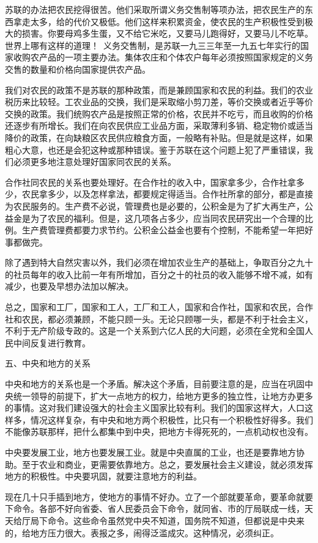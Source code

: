 \documentclass[UTF8, 12pt, a4paper]{ctexrep}
\begin{document}
苏联的办法把农民挖得很苦。他们采取所谓义务交售制等项办法，把农民生产的东西拿走太多，给的代价又极低。他们这样来积累资金，使农民的生产积极性受到极大的损害。你要母鸡多生蛋，又不给它米吃，又要马儿跑得好，又要马儿不吃草。世界上哪有这样的道理！~义务交售制，是苏联一九三三年至一九五七年实行的国家收购农产品的一项主要办法。集体农庄和个体农户每年必须按照国家规定的义务交售的数量和价格向国家提供农产品。~

我们对农民的政策不是苏联的那种政策，而是兼顾国家和农民的利益。我们的农业税历来比较轻。工农业品的交换，我们是采取缩小剪刀差，等价交换或者近乎等价交换的政策。我们统购农产品是按照正常的价格，农民并不吃亏，而且收购的价格还逐步有所增长。我们在向农民供应工业品方面，采取薄利多销、稳定物价或适当降价的政策，在向缺粮区农民供应粮食方面，一般略有补贴。但是就是这样，如果粗心大意，也还是会犯这种或那种错误。鉴于苏联在这个问题上犯了严重错误，我们必须更多地注意处理好国家同农民的关系。

合作社同农民的关系也要处理好。在合作社的收入中，国家拿多少，合作社拿多少，农民拿多少，以及怎样拿法，都要规定得适当。合作社所拿的部分，都是直接为农民服务的。生产费不必说，管理费也是必要的，公积金是为了扩大再生产，公益金是为了农民的福利。但是，这几项各占多少，应当同农民研究出一个合理的比例。生产费管理费都要力求节约。公积金公益金也要有个控制，不能希望一年把好事都做完。

除了遇到特大自然灾害以外，我们必须在增加农业生产的基础上，争取百分之九十的社员每年的收入比前一年有所增加，百分之十的社员的收入能够不增不减，如有减少，也要及早想办法加以解决。

总之，国家和工厂，国家和工人，工厂和工人，国家和合作社，国家和农民，合作社和农民，都必须兼顾，不能只顾一头。无论只顾哪一头，都是不利于社会主义，不利于无产阶级专政的。这是一个关系到六亿人民的大问题，必须在全党和全国人民中间反复进行教育。

五、中央和地方的关系

中央和地方的关系也是一个矛盾。解决这个矛盾，目前要注意的是，应当在巩固中央统一领导的前提下，扩大一点地方的权力，给地方更多的独立性，让地方办更多的事情。这对我们建设强大的社会主义国家比较有利。我们的国家这样大，人口这样多，情况这样复杂，有中央和地方两个积极性，比只有一个积极性好得多。我们不能像苏联那样，把什么都集中到中央，把地方卡得死死的，一点机动权也没有。

中央要发展工业，地方也要发展工业。就是中央直属的工业，也还是要靠地方协助。至于农业和商业，更需要依靠地方。总之，要发展社会主义建设，就必须发挥地方的积极性。中央要巩固，就要注意地方的利益。

现在几十只手插到地方，使地方的事情不好办。立了一个部就要革命，要革命就要下命令。各部不好向省委、省人民委员会下命令，就同省、市的厅局联成一线，天天给厅局下命令。这些命令虽然党中央不知道，国务院不知道，但都说是中央来的，给地方压力很大。表报之多，闹得泛滥成灾。这种情况，必须纠正。
\end{document}
